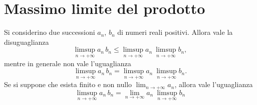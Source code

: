 \section{Massimo limite del prodotto}\label{prodottolimsup}
\begin{proposition}
Si considerino due successioni $a_n$, $b_n$ di numeri reali positivi.
Allora vale la disuguaglianza
\begin{equation}
	\limsup_{n\to +\infty} a_n\, b_n\leq  \limsup_{n\to +\infty} a_n\ \limsup_{n\to +\infty} b_n,
\end{equation}	
mentre in generale non vale l'uguaglianza 
\begin{equation*}
	\limsup_{n\to +\infty} a_n\, b_n=  \limsup_{n\to +\infty} a_n\ \limsup_{n\to +\infty} b_n.
\end{equation*}
Se si suppone che esista finito e non nullo $\displaystyle\lim_{n\to +\infty} a_n$, allora vale l'uguaglianza
\begin{equation}
	\limsup_{n\to +\infty} a_n\, b_n= \lim_{n\to +\infty} a_n\ \limsup_{n\to +\infty} b_n
\end{equation}
\end{proposition}
